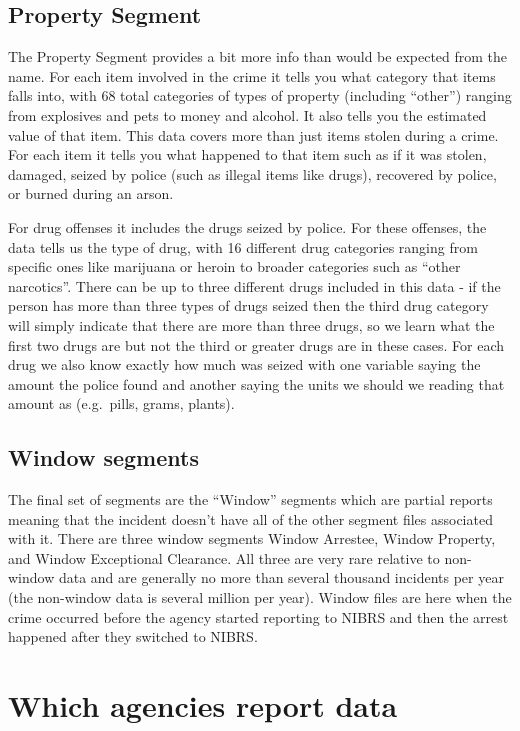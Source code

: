 \documentclass[
]{krantz}
\begin{document}
\subsection{Property Segment}\label{property-segment}

The Property Segment provides a bit more info than would be
expected from the name. For each item involved in the crime
it tells you what category that items falls into, with 68
total categories of types of property (including ``other'')
ranging from explosives and pets to money and alcohol. It
also tells you the estimated value of that item. This data
covers more than just items stolen during a crime. For each
item it tells you what happened to that item such as if it
was stolen, damaged, seized by police (such as illegal items
like drugs), recovered by police, or burned during an arson.

For drug offenses it includes the drugs seized by police.
For these offenses, the data tells us the type of drug, with
16 different drug categories ranging from specific ones like
marijuana or heroin to broader categories such as ``other
narcotics''. There can be up to three different drugs
included in this data - if the person has more than three
types of drugs seized then the third drug category will
simply indicate that there are more than three drugs, so we
learn what the first two drugs are but not the third or
greater drugs are in these cases. For each drug we also know
exactly how much was seized with one variable saying the
amount the police found and another saying the units we
should we reading that amount as (e.g.~pills, grams,
plants).

\subsection{Window segments}\label{window}

The final set of segments are the ``Window'' segments which
are partial reports meaning that the incident doesn't have
all of the other segment files associated with it. There are
three window segments Window Arrestee, Window Property, and
Window Exceptional Clearance. All three are very rare
relative to non-window data and are generally no more than
several thousand incidents per year (the non-window data is
several million per year). Window files are here when the
crime occurred before the agency started reporting to NIBRS
and then the arrest happened after they switched to NIBRS.

\section{Which agencies report
data}\label{which-agencies-report-data}
\end{document}
